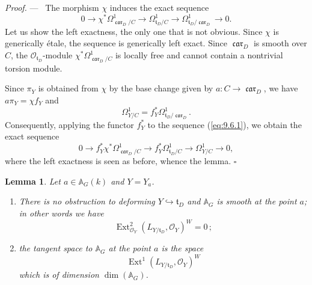 \documentclass[12pt,a4paper,oneside,english,leqno]{smfart}
\numberwithin{equation}{subsection}
\newcounter{theo}
\numberwithin{theo}{subsection}
\theoremstyle{plain}
\newtheorem{lemma}[theo]{Lemma}
\theoremstyle{definition}
\theoremstyle{remark}
\newenvironment{preuve}[1][]{\medskip\noindent\textit{Proof.} #1 ---\ }%
  {\hfill\ensuremath{\square}\medskip}
\DeclareMathOperator{\Ext}{Ext}
\DeclareMathOperator{\car}{\mathfrak{car}}
\newcommand{\AAA}{\mathbb{A}}
\newcommand{\oc}{\mathcal{O}}
\newcommand{\tgo}{\mathfrak{t}}
\begin{document}
\begin{preuve}
The morphism $\chi$ induces the exact sequence
\begin{equation}\label{eq:9.6.1}
0\longrightarrow\chi^*\Omega^1_{\car_D/C}\longrightarrow\Omega^1_{\tgo_D/C}\longrightarrow\Omega^1_{\tgo_D/\car_D}\longrightarrow 0.
\end{equation}
Let us show the left exactness, the only one that is not obvious. Since $\chi$ is generically étale, the sequence is generically left exact. Since $\car_D$ is smooth over $C$, the $\oc_{\tgo_D}$-module $\chi^*\Omega^1_{\car_D/C}$ is locally free and cannot contain a nontrivial torsion module.

Since $\pi_Y$ is obtained from $\chi$ by the base change given by $a:C\to\car_D$, we have $a\pi_Y=\chi f_Y$ and
\begin{equation}\label{eq:9.6.2}
\Omega^1_{Y/C}=f_Y^*\Omega^1_{\tgo_D/\car_D}.
\end{equation}
Consequently, applying the functor $f_Y^*$ to the sequence (\ref{eq:9.6.1}), we obtain the exact sequence
\begin{equation}\label{eq:9.6.3}
0\longrightarrow f_Y^*\chi^*\Omega^1_{\car_D/C}\longrightarrow f_Y^*\Omega^1_{\tgo_D/C}\longrightarrow\Omega^1_{Y/C}\longrightarrow 0,
\end{equation}
where the left exactness is seen as before, whence the lemma.
\end{preuve}

\begin{lemma}\label{thm:9.6.2}
Let $a\in\AAA_G(k)$ and $Y=Y_a$.
\begin{enumerate}
\item There is no obstruction to deforming $Y\hookrightarrow\tgo_D$ and $\AAA_G$ is smooth at the point $a$; in other words we have
  \[
\Ext^2_{\oc_Y}(L_{Y/\tgo_D},\oc_Y)^W=0\,;
  \]
\item the tangent space to $\AAA_G$ at the point $a$ is the space
  \[
\Ext^1(L_{Y/\tgo_D},\oc_Y)^W
  \]
which is of dimension $\dim(\AAA_G)$.
\end{enumerate}
\end{lemma}
\end{document}
